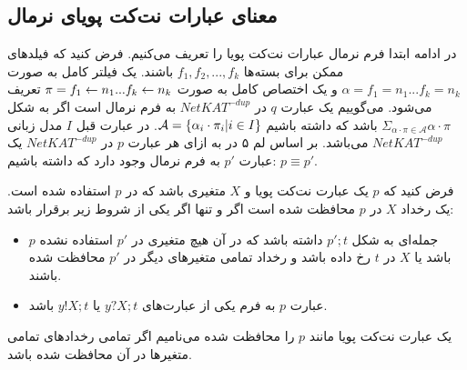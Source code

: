 \subsection{معنای عبارات نت‌کت پویای نرمال}
در ادامه ابتدا فرم نرمال عبارات نت‌کت پویا را تعریف می‌کنیم.
فرض کنید که فیلد‌های ممکن برای بسته‌ها 
$f_1,f_2,...,f_k$
باشند.
یک فیلتر کامل
به صورت
$\alpha = f_1 = n_1 ... f_k = n_k$
و یک اختصاص کامل
به صورت
$\pi = f_1 \leftarrow n_1 ... f_k \leftarrow n_k$
تعریف می‌شود.
می‌گوییم یک عبارت
$q$
در
$NetKAT^{-dup}$
به فرم نرمال است
اگر به شکل
$\Sigma_{\alpha\cdot\pi \in \mathcal{A}}\alpha\cdot\pi$
باشد که داشته باشیم
$\mathcal{A} = \{\alpha_i\cdot\pi_i | i \in I\}$.
در عبارت قبل
$I$
مدل زبانی
$NetKAT^{-dup}$
می‌باشد.
بر اساس لم ۵ در
\cite{dynetkat}
به ازای هر عبارت
$p$
در
$NetKAT^{-dup}$
یک عبارت
$p'$
به فرم نرمال وجود دارد که داشته باشیم:
$p\equiv p'$.

\begin{definition}
    فرض کنید که 
    $p$
    یک عبارت نت‌کت پویا و 
    $X$
    متغیری باشد که در 
    $p$
    استفاده شده است.
    یک رخداد 
    $X$
    در 
    $p$
    محافظت شده 
    است اگر و تنها اگر یکی از شروط زیر برقرار باشد:
    \begin{itemize}
        \item $p$
         جمله‌ای به شکل 
        $p';t$
        داشته باشد که در آن 
        هیچ متغیری در 
        $p'$
        استفاده نشده باشد یا 
        $X$ 
        در 
        $t$
        رخ داده باشد و رخداد تمامی متغیر‌های دیگر در 
        $p'$
        محافظت شده باشند.
        \item عبارت 
        $p$
        به فرم یکی از عبارت‌های 
        $y?X;t$
        یا
        $y!X;t$
        باشد.
    \end{itemize}
\end{definition}

\begin{definition}
    یک عبارت نت‌کت پویا مانند 
    $p$
    را محافظت‌ شده
    می‌نامیم اگر تمامی رخداد‌های تمامی متغیر‌ها در آن محافظت شده باشد.
\end{definition}

